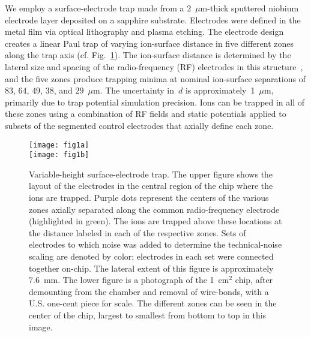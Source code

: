 \documentclass[reprint,twocolumn,prl,amsmath,amssymb,longbibliography,aps,superscriptaddress]{revtex4-1}
\begin{document}
We employ a surface-electrode trap made from a $2$~$\mu$m-thick sputtered niobium electrode layer deposited on a sapphire substrate.  Electrodes were defined in the metal film via optical lithography and plasma etching.  The electrode design creates a linear Paul trap of varying ion-surface distance in five different zones along the trap axis (cf. Fig.~\ref{fig:electrodes}).  The ion-surface distance is determined by the lateral size and spacing of the radio-frequency (RF) electrodes in this structure~\cite{PhysRevA.78.033402,PhysRevA.78.063410}, and the five zones produce trapping minima at nominal ion-surface separations of $83$, $64$, $49$, $38$, and $29$~$\mu$m.  The uncertainty in~$d$ is approximately~1~$\mu$m, primarily due to trap potential simulation precision.  Ions can be trapped in all of these zones using a combination of RF fields and static potentials applied to subsets of the segmented control electrodes that axially define each zone.

\begin{figure}[t b !]

\texttt{[image: fig1a]}\\
\vspace{0.2 cm}
\texttt{[image: fig1b]}
\caption{Variable-height surface-electrode trap.  The upper figure shows the layout of the electrodes in the central region of the chip where the ions are trapped.  Purple dots represent the centers of the various zones axially separated along the common radio-frequency electrode (highlighted in green).  The ions are trapped above these locations at the distance labeled in each of the respective zones.  Sets of electrodes to which noise was added to determine the technical-noise scaling are denoted by color; electrodes in each set were connected together on-chip.  The lateral extent of this figure is approximately~$7.6$~mm.  The lower figure is a photograph of the 1~cm$^{2}$ chip, after demounting from the chamber and removal of wire-bonds, with a U.S. one-cent piece for scale.  The different zones can be seen in the center of the chip, largest to smallest from bottom to top in this image.}
\label{fig:electrodes}
\end{figure}
\end{document}
